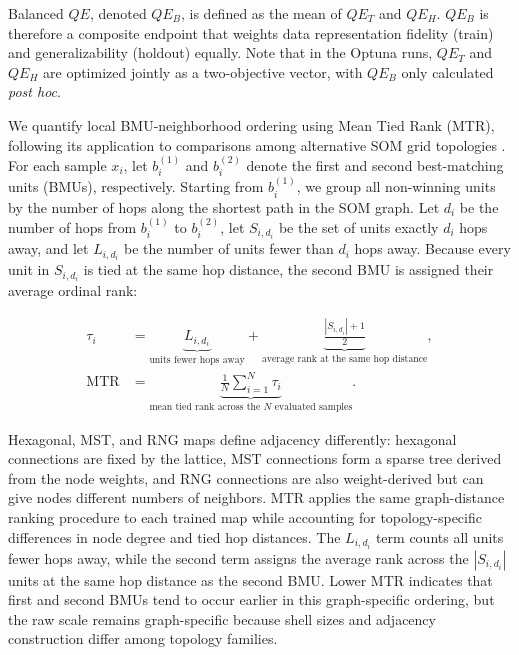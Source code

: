 \documentclass[10pt]{article} %
\begin{document}
Balanced $QE$, denoted $QE_B$, is defined as the mean of $QE_T$ and $QE_H$. $QE_B$ is therefore a composite endpoint that weights data representation fidelity (train) and generalizability (holdout) equally. Note that in the Optuna runs, $QE_T$ and $QE_H$ are optimized jointly as a two-objective vector, with $QE_B$ only calculated \emph{post hoc}.

We quantify local BMU-neighborhood ordering using Mean Tied Rank (MTR), following its application to comparisons among alternative SOM grid topologies \citep{lopez-rubioGridTopologiesSelforganizing2014}. For each sample $x_i$, let $b_i^{(1)}$ and $b_i^{(2)}$ denote the first and second best-matching units (BMUs), respectively. Starting from $b_i^{(1)}$, we group all non-winning units by the number of hops along the shortest path in the SOM graph. Let $d_i$ be the number of hops from $b_i^{(1)}$ to $b_i^{(2)}$, let $S_{i,d_i}$ be the set of units exactly $d_i$ hops away, and let $L_{i,d_i}$ be the number of units fewer than $d_i$ hops away. Because every unit in $S_{i,d_i}$ is tied at the same hop distance, the second BMU is assigned their average ordinal rank:

\begin{equation*}
\begin{aligned}
\tau_i
&= \underbrace{L_{i,d_i}}_{\text{units fewer hops away}}
 + \underbrace{\frac{|S_{i,d_i}|+1}{2}}_{\text{average rank at the same hop distance}}, \\
\mathrm{MTR}
&= \underbrace{\frac{1}{N}\sum_{i=1}^{N}\tau_i}_{\text{mean tied rank across the }N\text{ evaluated samples}}.
\end{aligned}
\end{equation*}

Hexagonal, MST, and RNG maps define adjacency differently: hexagonal connections are fixed by the lattice, MST connections form a sparse tree derived from the node weights, and RNG connections are also weight-derived but can give nodes different numbers of neighbors. MTR applies the same graph-distance ranking procedure to each trained map while accounting for topology-specific differences in node degree and tied hop distances. The $L_{i,d_i}$ term counts all units fewer hops away, while the second term assigns the average rank across the $|S_{i,d_i}|$ units at the same hop distance as the second BMU. Lower MTR indicates that first and second BMUs tend to occur earlier in this graph-specific ordering, but the raw scale remains graph-specific because shell sizes and adjacency construction differ among topology families.
\end{document}
